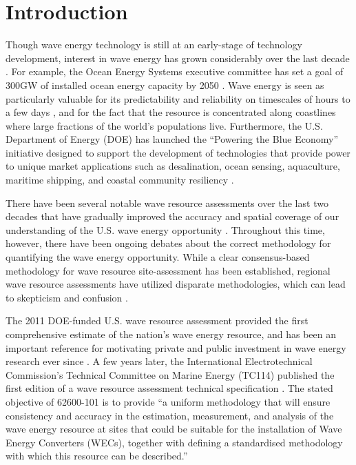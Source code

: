 \section{Introduction}

Though wave energy technology is still at an
early-stage of technology development, interest in wave energy has grown
considerably over the last decade
\citep[]{babaritOceanWaveEnergy2017}. For example, the Ocean Energy Systems executive committee has set a goal of 300GW of installed ocean energy capacity by 2050 \citep[]{huckerbyInternationalVisionOcean2017}. Wave energy is seen as particularly
valuable for its predictability and reliability on timescales of hours
to a few days \citep{parkinsonIntegratingOceanWave2015}, and for the
fact that the resource is concentrated along coastlines where large
fractions of the world's populations live. Furthermore, the
U.S. Department of Energy (DOE) has launched the ``Powering the Blue
Economy'' initiative designed to support the development of
technologies that provide power to unique market applications such as
desalination, ocean sensing, aquaculture, maritime shipping, and coastal community
resiliency \citep{livecchiPoweringBlueEconomy2019}. 

There have been several notable wave resource assessments over the last two decades that have gradually improved the accuracy and spatial coverage of our understanding of the U.S. wave energy opportunity \citep[]{EPRIwaveresource2011, garcia-medinaWaveResourceAssessment2014, bedardOceanWaveEnergy2005}. Throughout this time, however, there have been ongoing debates about the correct methodology for quantifying the wave energy opportunity. While a clear consensus-based methodology for wave resource site-assessment has been established, regional wave resource assessments have utilized disparate methodologies, which can lead to skepticism and confusion \citep[]{robertsonCharacterizingShoreWave2014, gunnQuantifyingGlobalWave2012, hughesNationalscaleWaveEnergy2010, hemerRevisedAssessmentAustralia2017, nationalresearchcouncilEvaluationDepartmentEnergy2013}.

The 2011 DOE-funded U.S. wave resource assessment provided the first
comprehensive estimate of the nation’s wave energy resource, and has
been an important reference for motivating private and public
investment in wave energy research ever since
\citep[][hereafter `EPRI 2011']{EPRIwaveresource2011}. A few years later, the International Electrotechnical Commission's Technical Committee on
Marine Energy (TC114) published the first edition of a wave
resource assessment technical specification \citep[][hereafter, 62600-101]{internationalelectrotechnicalcommissionPart101Wave2015}. The stated objective of 62600-101 is to provide ``a uniform
methodology that will ensure consistency and accuracy in the
estimation, measurement, and analysis of the wave energy resource at
sites that could be suitable for the installation of Wave Energy
Converters (WECs), together with defining a standardised methodology
with which this resource can be described.''

